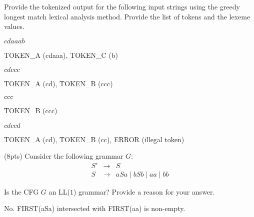 \documentclass[11pt]{article}
\begin{document}
\begin{exe}
Provide the tokenized output for the following input strings using
the greedy longest match lexical analysis method. Provide the list
of tokens and the lexeme values.

\begin{xlist}

{\ex $cdaaab$
\begin{soln}
TOKEN\_A (cdaaa), TOKEN\_C (b)
\end{soln}
}

{\ex $cdccc$
\begin{soln}
TOKEN\_A (cd), TOKEN\_B (ccc)
\end{soln}
}

{\ex $ccc$
\begin{soln}
TOKEN\_B (ccc)
\end{soln}
}

{\ex $cdccd$
\begin{soln}
TOKEN\_A (cd), TOKEN\_B (cc), ERROR (illegal token)
\end{soln}
}

\end{xlist}

\bigskip

  \ex\label{cfg2} (8pts) Consider the following grammar $G$:
  \begin{eqnarray}
    S' & \rightarrow & S \nonumber \\
    S & \rightarrow & aSa \mid bSb \mid aa \mid bb \nonumber
  \end{eqnarray}
      
  \begin{xlist}
    {\ex Is the CFG $G$ an LL($1$) grammar? Provide a reason for your
    answer.
      \begin{soln}
        No. FIRST(aSa) intersected with FIRST(aa) is non-empty.
      \end{soln}
    }



\end{xlist}
\end{exe}
\end{document}
